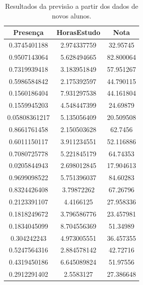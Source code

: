 \documentclass[12 pt]{article}
\begin{document}
\begin{enumerate}
    \begin{table}[H]
        \centering
        \caption{Resultados da previsão a partir dos dados de novos alunos.}
        \begin{tabular}{|c|c|c|}
            \hline
            \textbf{Presença} & \textbf{HorasEstudo} & \textbf{Nota} \\
            \hline
            0.3745401188 & 2.974337759 & 32.95745 \\
            \hline
            0.9507143064 & 5.628494665 & 82.800064 \\
            \hline
            0.7319939418 & 3.183951849 & 57.951267 \\
            \hline
            0.5986584842 & 2.175392597 & 44.790115 \\
            \hline
            0.1560186404 & 7.931297538 & 44.161804 \\
            \hline
            0.1559945203 & 4.548447399 & 24.69879 \\
            \hline
            0.05808361217 & 5.135056409 & 20.509508 \\
            \hline
            0.8661761458 & 2.150503628 & 62.7456 \\
            \hline
            0.6011150117 & 3.911234551 & 52.116886 \\
            \hline
            0.7080725778 & 5.221845179 & 64.74353 \\
            \hline
            0.0205844943 & 2.698012845 & 17.904613 \\
            \hline
            0.9699098522 & 5.751396037 & 84.60283 \\
            \hline
            0.8324426408 & 3.79872262 & 67.26796 \\
            \hline
            0.2123391107 & 4.4166125 & 27.958336 \\
            \hline
            0.1818249672 & 3.796586776 & 23.457981 \\
            \hline
            0.1834045099 & 8.704556369 & 51.34989 \\
            \hline
            0.304242243  & 4.973005551 & 36.457355 \\
            \hline
            0.5247564316 & 2.884578142 & 42.72716 \\
            \hline
            0.4319450186 & 6.645089824 & 51.97556 \\
            \hline
            0.2912291402 & 2.5583127   & 27.386648 \\
            \hline
        \end{tabular}
    \end{table}


\end{enumerate}
\end{document}
